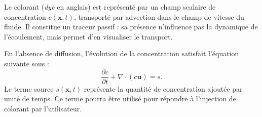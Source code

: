 Le colorant (\textit{dye} en anglais) est représenté par un champ
scalaire de concentration $c(\mathbf{x}, t)$, transporté par
advection dans le champ de vitesse du fluide.
Il constitue un traceur passif : sa présence n'influence pas
la dynamique de l'écoulement, mais permet d'en visualiser le transport.

En l'absence de diffusion, l'évolution de la concentration satisfait
l'équation suivante sous
 :
\begin{equation}
    \label{eq:dye_transport}
    \boxed{
        \frac{\partial c}{\partial t}
        + \nabla \cdot (c\mathbf{u}) = s.
    }
\end{equation}
Le terme source $s(\mathbf{x}, t)$ représente la quantité de
concentration ajoutée par unité de temps. Ce terme pourra être utilisé pour répondre à
l'injection de colorant par l'utilisateur.